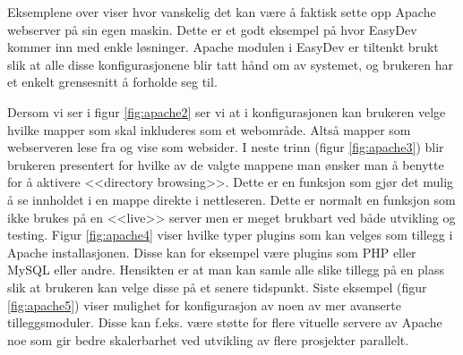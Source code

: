 Eksemplene over viser hvor vanskelig det kan være å faktisk sette opp Apache webserver på sin egen maskin.  
Dette er et godt eksempel på hvor EasyDev kommer inn med enkle løsninger. Apache modulen i EasyDev er tiltenkt brukt slik at alle disse konfigurasjonene blir tatt hånd om av systemet, og brukeren har et enkelt grensesnitt å forholde seg til.

Dersom vi ser i figur \ref{fig:apache2} ser vi at i konfigurasjonen kan brukeren velge hvilke mapper som skal inkluderes som et webområde. Altså mapper som webserveren lese fra og vise som websider.
I neste trinn (figur \ref{fig:apache3}) blir brukeren presentert for hvilke av de valgte mappene man ønsker man å benytte for å aktivere <<directory browsing>>. Dette er en funksjon som gjør det mulig å se innholdet i en mappe direkte i nettleseren. Dette er normalt en funksjon som ikke brukes på en <<live>> server men er meget brukbart ved både utvikling og testing. 
Figur \ref{fig:apache4} viser hvilke typer plugins som kan velges som tillegg i Apache installasjonen. Disse kan for eksempel være plugins som PHP eller MySQL eller andre. Hensikten er at man kan samle alle slike tillegg på en plass slik at brukeren kan velge disse på et senere tidspunkt.
Siste eksempel (figur \ref{fig:apache5}) viser mulighet for konfigurasjon av noen av mer avanserte tilleggsmoduler. Disse kan f.eks. være støtte for flere vituelle servere av Apache noe som gir bedre skalerbarhet ved utvikling av flere prosjekter parallelt. 
